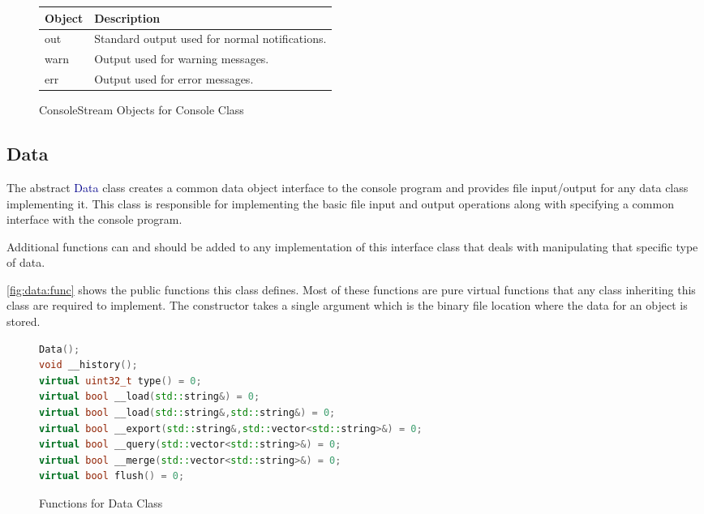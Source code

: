 \documentclass[10pt]{article}
\providecommand{\h}[1]{\textcolor{darkblue}{#1}}
\begin{document}
\begin{figure}[H]
\begin{mdframed}[style=vtable]
\begin{tabularx}{\textwidth}{|l|X|}
\hline
\textbf{Object} & \textbf{Description} \\
\hline
out & Standard output used for normal notifications. \\
\hline
warn & Output used for warning messages. \\
\hline
err & Output used for error messages. \\
\hline
\end{tabularx}
\end{mdframed}
\caption{ConsoleStream Objects for Console Class}
\label{mainp:console:objects}
\end{figure}

\subsection{Data}

The abstract \h{Data} class creates a common data object interface to the 
console program and provides file input/output for any data class implementing 
it. This class is responsible for implementing the basic file input and output 
operations along with specifying a common interface with the console program.

Additional functions can and should be added to any implementation of this 
interface class that deals with manipulating that specific type of data.

\autoref{fig:data:func} shows the public functions this class defines. Most of 
these functions are pure virtual functions that any class inheriting this class 
are required to implement. The constructor takes a single argument which is the 
binary file location where the data for an object is stored.

\begin{figure}[H]
\begin{mdframed}[style=functions]
\begin{lstlisting}[language=C++]
Data();
void __history();
virtual uint32_t type() = 0;
virtual bool __load(std::string&) = 0;
virtual bool __load(std::string&,std::string&) = 0;
virtual bool __export(std::string&,std::vector<std::string>&) = 0;
virtual bool __query(std::vector<std::string>&) = 0;
virtual bool __merge(std::vector<std::string>&) = 0;
virtual bool flush() = 0;
\end{lstlisting}
\end{mdframed}
\caption{Functions for Data Class}
\label{fig:data:func}
\end{figure}
\end{document}
